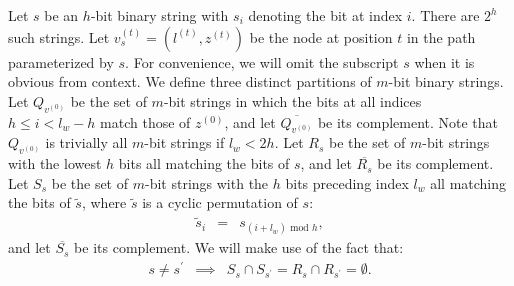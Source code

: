 \documentclass[10pt,letterpaper]{article}
\newcommand{\beq}{\begin{eqnarray}}
\newcommand{\eeq}{\end{eqnarray}}
\begin{document}
Let $s$ be an $h$-bit binary string with $s_i$ denoting the bit at index $i$.
There are $2^h$ such strings.
Let $v_s^{(t)} = (l^{(t)}, z^{(t)})$ be the node at position $t$
in the path parameterized by $s$.
For convenience,
we will omit the subscript $s$ when it is obvious from context.
We define three distinct partitions of $m$-bit binary strings.
Let $Q_{v^{(0)}}$ be the set of $m$-bit
strings in which the bits at
all indices $h \leq i < l_w - h$ match those of $z^{(0)}$,
and let $\overline{Q_{v^{(0)}}}$ be its complement.
Note that $Q_{v^{(0)}}$ is trivially all $m$-bit strings if $l_w < 2h$.
Let $R_s$ be the set of $m$-bit strings with the lowest $h$
bits all matching the bits of $s$,
and let $\overline{R_s}$ be its complement.
Let $S_s$ be the set of $m$-bit strings with the $h$ bits
preceding index $l_w$ all matching the bits of $\tilde{s}$,
where $\tilde{s}$ is a cyclic permutation of $s$:
\beq
\tilde{s}_i &=& s_{(i + l_w) \text{ mod } h},
\eeq
and let $\overline{S_s}$ be its complement.
We will make use of the fact that:
\beq
s \neq s^\prime &\implies&
S_s \cap S_{s^\prime} = R_s \cap R_{s^\prime} = \emptyset.
\eeq
\end{document}
